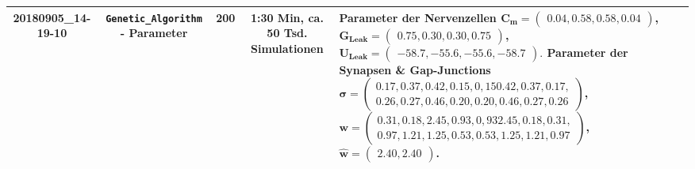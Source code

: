 {\begin{landscape}
\begin{tabular}{c@{\hskip 0.5cm}c@{\hskip 0.5cm}c@{\hskip 0.5cm}c@{\hskip 0.5cm}p{85mm}}
				20180905\_14-19-10		& \texttt{Genetic\_Algorithm} - Parameter& 200			& 1:30 Min, ca. 50 Tsd. Simulationen		& Parameter der Nervenzellen \newline
				$\boldsymbol{C_m} = \begin{pmatrix}0.04, 0.58, 0.58, 0.04\end{pmatrix}$,\newline
				$\boldsymbol{G_{Leak}} = \begin{pmatrix}0.75, 0.30, 0.30, 0.75\end{pmatrix}$,\newline
				$\boldsymbol{U_{Leak}} = \begin{pmatrix}-58.7, -55.6, -55.6, -58.7\end{pmatrix}.$ \vspace{0.2cm} \newline
				Parameter der Synapsen \& Gap-Junctions \newline
				$\boldsymbol{\sigma} = \begin{pmatrix}0.17, 0.37, 0.42, 0.15, 0,15 0.42, 0.37, 0.17,\\ 0.26, 0.27, 0.46, 0.20, 0.20, 0.46, 0.27, 0.26\end{pmatrix}$,\newline
				$\boldsymbol{w} = \begin{pmatrix}0.31, 0.18, 2.45, 0.93, 0,93 2.45, 0.18, 0.31,\\ 0.97, 1.21, 1.25, 0.53, 0.53, 1.25, 1.21, 0.97\end{pmatrix}$,\newline
				$\boldsymbol{\hat{w}} = \begin{pmatrix}2.40, 2.40\end{pmatrix}$.\vspace{0.5cm}\\
				
				\bottomrule
				\hline
			\end{tabular}
			\label{tab:app_erg}
		\end{landscape}
		\clearpage%
	}
	


